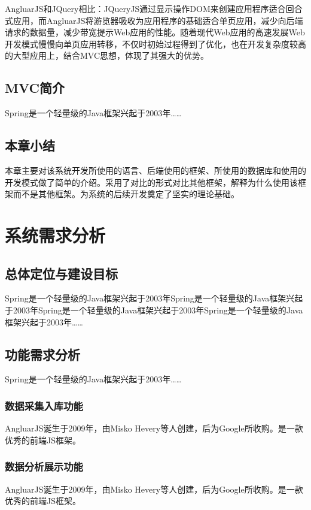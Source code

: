 \documentclass{husethesis}
\begin{document}
AngluarJS和JQuery相比：JQueryJS通过显示操作DOM来创建应用程序适合回合式应用，而AngluarJS将游览器吸收为应用程序的基础适合单页应用，减少向后端请求的数据量，减少带宽提示Web应用的性能。随着现代Web应用的高速发展Web开发模式慢慢向单页应用转移，不仅时初始过程得到了优化，也在开发复杂度较高的大型应用上，结合MVC思想，体现了其强大的优势。

\subsection{MVC简介}
Spring是一个轻量级的Java框架兴起于2003年……

\subsection{本章小结}
本章主要对该系统开发所使用的语言、后端使用的框架、所使用的数据库和使用的开发模式做了简单的介绍。采用了对比的形式对比其他框架，解释为什么使用该框架而不是其他框架。为系统的后续开发奠定了坚实的理论基础。
\clearpage


\section{系统需求分析}


\subsection{总体定位与建设目标}
Spring是一个轻量级的Java框架兴起于2003年Spring是一个轻量级的Java框架兴起于2003年Spring是一个轻量级的Java框架兴起于2003年Spring是一个轻量级的Java框架兴起于2003年……

\subsection{功能需求分析}
Spring是一个轻量级的Java框架兴起于2003年……

\subsubsection{数据采集入库功能}
AngluarJS诞生于2009年，由Misko Hevery等人创建，后为Google所收购。是一款优秀的前端JS框架。

\subsubsection{数据分析展示功能}
AngluarJS诞生于2009年，由Misko Hevery等人创建，后为Google所收购。是一款优秀的前端JS框架。
\end{document}
